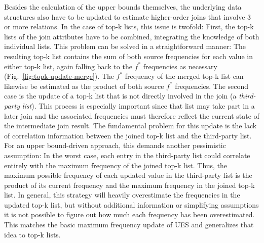 Besides the calculation of the upper bounds themselves, the underlying data structures also have to be updated to estimate higher-order joins that involve 3 or more relations. 
In the case of top-k lists, this issue is twofold: First, the top-k lists of the join attributes have to be combined, integrating the knowledge of both individual lists. 
This problem can be solved in a straightforward manner: The resulting top-k list contains the sum of both source frequencies for each value in either top-k list, again falling back to the $f^\ast$ frequencies as necessary (Fig.~\ref{fig:topk-update-merge}). 
The $f^\ast$ frequency of the merged top-k list can likewise be estimated as the product of both source $f^\ast$ frequencies. 
The second case is the update of a top-k list that is not directly involved in the join (a \emph{third-party list}). 
This process is especially important since that list may take part in a later join and the associated frequencies must therefore reflect the current state of the intermediate join result. 
The fundamental problem for this update is the lack of correlation information between the joined top-k list and the third-party list. 
For an upper bound-driven approach, this demands another pessimistic assumption: In the worst case, each entry in the third-party list could correlate entirely with the maximum frequency of the joined top-k list. 
Thus, the maximum possible frequency of each updated value in the third-party list is the product of its current frequency and the maximum frequency in the joined top-k list. 
In general, this strategy will heavily overestimate the frequencies in the updated top-k list, but without additional information or simplifying assumptions it is not possible to figure out how much each frequency has been overestimated. 
This matches the basic maximum frequency update of UES and generalizes that idea to top-k lists.
